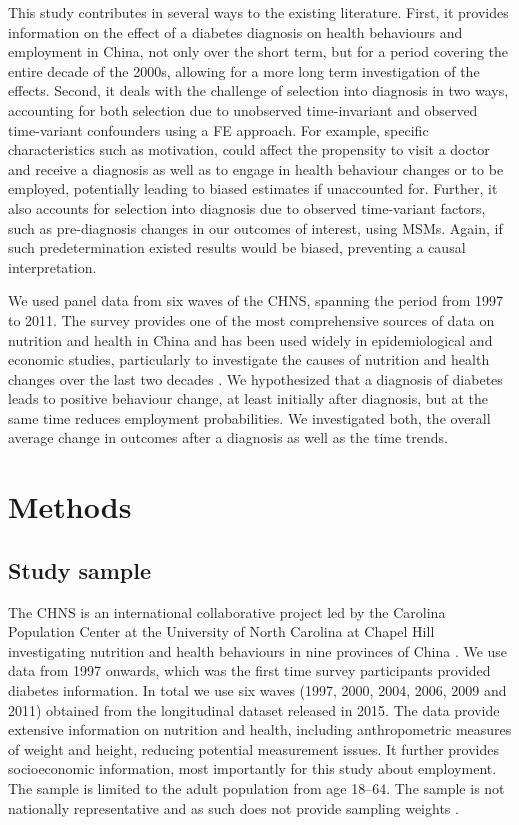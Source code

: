 This study contributes in several ways to the existing literature. First, it provides information on the effect of a diabetes diagnosis on health behaviours and employment in China, not only over the short term, but for a period covering the entire decade of the 2000s, allowing for a more long term investigation of the effects. Second, it deals with the challenge of selection into diagnosis in two ways, accounting for both selection due to unobserved time-invariant and observed time-variant confounders using a \ac{FE} approach. For example, specific characteristics such as motivation, could affect the propensity to visit a doctor and receive a diagnosis as well as to engage in health behaviour changes or to be employed, potentially leading to biased estimates if unaccounted for. Further, it also accounts for selection into diagnosis due to observed time-variant factors, such as pre-diagnosis changes in our outcomes of interest, using \acp{MSM}. Again, if such predetermination existed results would be biased, preventing a causal interpretation.  

We used panel data from six waves of the \acf{CHNS}, spanning the period from 1997 to 2011. The survey provides one of the most comprehensive sources of data on nutrition and health in China and has been used widely in epidemiological and economic studies, particularly to investigate the causes of nutrition and health changes over the last two decades \parencite{Zhang2014d}. We hypothesized that a diagnosis of diabetes leads to positive behaviour change, at least initially after diagnosis, but at the same time reduces employment probabilities. We investigated both, the overall average change in outcomes after a diagnosis as well as the time trends. 
\section{\label{sec:Methods5}Methods}

\subsection{Study sample}

The \ac{CHNS} is an international collaborative project led by the Carolina Population Center at the University of North Carolina at Chapel Hill investigating nutrition and health behaviours in nine provinces of China \parencite{Zhang2014d}. We use data from 1997 onwards, which was the first time survey participants provided diabetes information. In total we use six waves (1997, 2000, 2004, 2006, 2009 and 2011) obtained from the longitudinal dataset released in 2015. The data provide extensive information on nutrition and health, including anthropometric measures of weight and height, reducing potential measurement issues. It further provides socioeconomic information, most importantly for this study about employment. The sample is limited to the adult population from age 18--64.  The sample is not nationally representative and as such does not provide sampling weights  \parencite{Popkin2010}.

